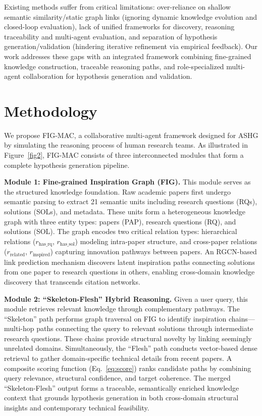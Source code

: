 \documentclass[runningheads]{llncs}
\begin{document}
Existing methods suffer from critical limitations: over-reliance on shallow semantic similarity/static graph links (ignoring dynamic knowledge evolution and closed-loop evaluation), lack of unified frameworks for discovery, reasoning traceability and multi-agent evaluation, and separation of hypothesis generation/validation (hindering iterative refinement via empirical feedback). Our work addresses these gaps with an integrated framework combining fine-grained knowledge construction, traceable reasoning paths, and role-specialized multi-agent collaboration for hypothesis generation and validation.


\section{Methodology}
\label{sec:methodology}

We propose FIG-MAC, a collaborative multi-agent framework designed for ASHG by simulating the reasoning process of human research teams. As illustrated in Figure~\ref{fig2}, FIG-MAC consists of three interconnected modules that form a complete hypothesis generation pipeline.

\textbf{Module 1: Fine-grained Inspiration Graph (FIG).} This module serves as the structured knowledge foundation. Raw academic papers first undergo semantic parsing to extract 21 semantic units including research questions (RQs), solutions (SOLs), and metadata. These units form a heterogeneous knowledge graph with three entity types: papers (PAP), research questions (RQ), and solutions (SOL). The graph encodes two critical relation types: hierarchical relations ($r_{\text{has\_rq}}$, $r_{\text{has\_sol}}$) modeling intra-paper structure, and cross-paper relations ($r_{\text{related}}$, $r_{\text{inspired}}$) capturing innovation pathways between papers. An RGCN-based link prediction mechanism discovers latent inspiration paths connecting solutions from one paper to research questions in others, enabling cross-domain knowledge discovery that transcends citation networks.

\textbf{Module 2: ``Skeleton-Flesh'' Hybrid Reasoning.} Given a user query, this module retrieves relevant knowledge through complementary pathways. The ``Skeleton'' path performs graph traversal on FIG to identify inspiration chains---multi-hop paths connecting the query to relevant solutions through intermediate research questions. These chains provide structural novelty by linking seemingly unrelated domains. Simultaneously, the ``Flesh'' path conducts vector-based dense retrieval to gather domain-specific technical details from recent papers. A composite scoring function (Eq.~\ref{eq:score}) ranks candidate paths by combining query relevance, structural confidence, and target coherence. The merged ``Skeleton-Flesh'' output forms a traceable, semantically enriched knowledge context that grounds hypothesis generation in both cross-domain structural insights and contemporary technical feasibility.
\end{document}
